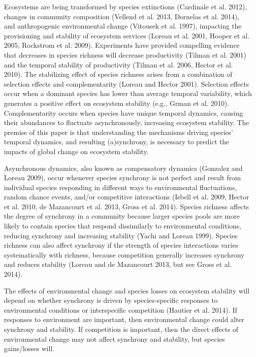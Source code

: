 \documentclass[12pt,]{article}
\begin{document}
Ecosystems are being transformed by species extinctions (Cardinale et
al. 2012), changes in community composition (Vellend et al. 2013,
Dornelas et al. 2014), and anthropogenic environmental change (Vitousek
et al. 1997), impacting the provisioning and stability of ecosystem
services (Loreau et al. 2001, Hooper et al. 2005, Rockstrom et al.
2009). Experiments have provided compelling evidence that decreases in
species richness will decrease productivity (Tilman et al. 2001) and the
temporal stability of productivity (Tilman et al. 2006, Hector et al.
2010).
The stabilizing effect of species richness arises from a combination of selection effects and complementarity (Loreau and Hector 2001).
Selection effects occur when a dominant species has lower than average temporal variability, which generates a positive effect on ecosystem stability (e.g., Grman et al. 2010).
Complementarity occurs when species have unique temporal dynamics, causing their abundances to fluctuate asynchronously, increasing ecosystem stability.
The premise of this paper is that understanding the mechanisms driving species' temporal dynamics, and resulting (a)synchrony, is necessary to predict the impacts of global change on ecosystem stability.

Asynchronous dynamics, also known as compensatory dynamics (Gonzalez and Loreau 2009),
occur whenever species synchrony is not perfect and
result from individual species responding in different ways to
environmental fluctuations, random chance events, and/or competitive
interactions (Isbell et al. 2009, Hector et al. 2010, {{de Mazancourt}}
et al. 2013, Gross et al. 2014). Species richness affects
the degree of synchrony in a community because larger
species pools are more likely to contain species that respond
dissimilarly to environmental conditions, reducing synchrony and
increasing stability (Yachi and Loreau 1999).
Species richness can also affect synchrony if the strength of species interactions varies systematically with richness, because competition generally increases synchrony and reduces stability
(Loreau and {{de Mazancourt}} 2013, but see Gross et al. 2014).

The effects of environmental change and species losses on ecosystem stability will depend on whether synchrony is driven by species-specific responses to environmental conditions or interspecific competition
(Hautier et al. 2014).
If responses to environment are important, then environmental change could alter synchrony and stability.
If competition is important, then the direct effects of environmental change may not affect synchrony and stability, but species gains/losses will.
\end{document}
